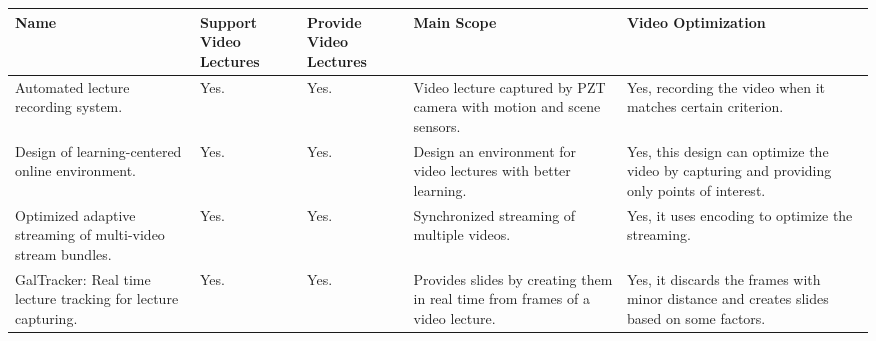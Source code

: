 \begin{sideways}
\centering
\begin{tabularx}{1.5\textwidth} { 
  | >{\raggedright\arraybackslash}X 
  | >{\centering\arraybackslash}X | >{\centering\arraybackslash}X | >{\centering\arraybackslash}X | >{\centering\arraybackslash}X | }
 \hline
\bfseries{Name} & \bfseries{Support Video Lectures} &\bfseries{Provide Video Lectures} &\bfseries{Main Scope} & \bfseries{Video Optimization}  \\
\hline
Automated lecture recording system.\cite{Chou2010}
& Yes.
& Yes.
& Video lecture captured by PZT camera with motion and scene sensors.
& Yes, recording the video when it matches certain criterion.
\\
\hline
Design of learning-centered online environment.\cite{Garcia-Cabrero2018}
& Yes.
& Yes.
& Design an environment for video lectures with better learning.
& Yes, this design can optimize the video by capturing and providing only points of interest.
\\
\hline
Optimized adaptive streaming of multi-video stream bundles.\cite{Carlsson2017}
& Yes.
& Yes.
& Synchronized streaming of multiple videos.
& Yes, it uses encoding to optimize the streaming.
\\

\hline
GalTracker: Real time lecture tracking for lecture capturing.\cite{Gonzalez-Agulla2013}
& Yes.
& Yes.
& Provides slides by creating them in real time from frames of a video lecture.
& Yes, it discards the frames with minor distance and creates slides based on some factors.
\\
\hline

\end{tabularx}
\end{sideways}



